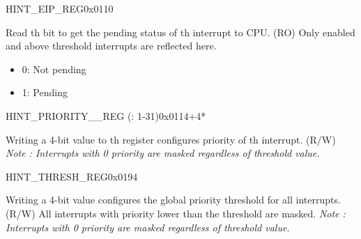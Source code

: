\begin{register}{H}{INT\_EIP\_REG}{0x0110}\label{regdesc:INTEIPREG}
%
%
\regnewline%
\begin{regdesc}
\begin{reglist}
\item [INT\_EIP\lbrack\regindex{n}\rbrack] Read th bit to get the pending status of th interrupt to CPU. (RO) \newline Only enabled and above threshold interrupts are reflected here.
\begin{itemize}
    \setlength\itemsep{-1em}
    \item 0: Not pending
    \item 1: Pending
\end{itemize}
\end{reglist}
\end{regdesc}
\end{register}

\begin{register}{H}{INT\_PRIORITY\_\_REG (: 1-31)}{0x0114+4*}\label{regdesc:INTPRIORITYREG}
%
%
\regnewline%
\begin{regdesc}
\begin{reglist}
\label{fielddesc:INTPRIORITY}\item [INT\_PRIORITY\_\regindex{n}] Writing a 4-bit value to th register configures priority of th interrupt. (R/W) \newline \textit{Note : Interrupts with 0 priority are masked regardless of threshold value.}
\end{reglist}
\end{regdesc}
\end{register}

\begin{register}{H}{INT\_THRESH\_REG}{0x0194}\label{regdesc:INTTHRESHREG}
%
%
\regnewline%
\begin{regdesc}
\begin{reglist}
\label{fielddesc:INTTHRESH}\item [INT\_THRESH] Writing a 4-bit value configures the global priority threshold for all interrupts. (R/W) \newline All interrupts with priority lower than the threshold are masked. \newline \textit{Note : Interrupts with 0 priority are masked regardless of threshold value.}
\end{reglist}
\end{regdesc}
\end{register}
